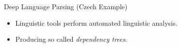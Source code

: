 \documentclass[xcolor=dvipsnames]{beamer}
\begin{document}
\begin{frame}{Deep Language Parsing (Czech Example)}  
\begin{itemize}
	\item Linguistic tools perform automated linguistic analysis.
	\item Producing so called \emph{dependency trees}.
	\medskip	
	\begin{center}
	\end{center}	
\end{itemize}
\end{frame}
\end{document}

